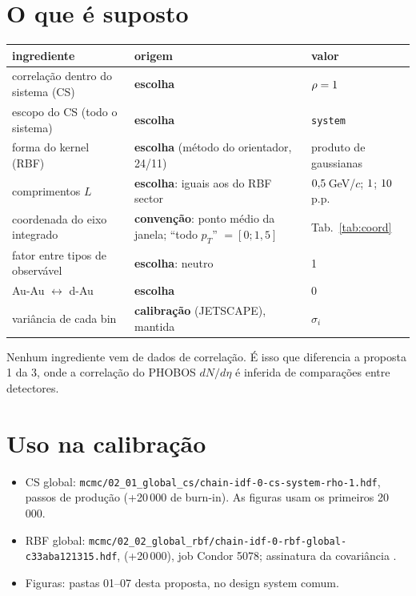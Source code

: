 \documentclass[11pt,a4paper]{article}
\newcommand{\arq}[1]{\texttt{\nolinkurl{#1}}}
\begin{document}
\section{O que é suposto}
\begin{center}\small
\begin{tabularx}{\linewidth}{@{}Y l l@{}}
\toprule
ingrediente & origem & valor \\
\midrule
correlação dentro do sistema (CS) & \textbf{escolha} & $\rho=1$ \\
escopo do CS (todo o sistema) & \textbf{escolha} & \texttt{system} \\
forma do kernel (RBF) & \textbf{escolha} (método do orientador, 24/11) & produto de gaussianas \\
comprimentos $L$ & \textbf{escolha}: iguais aos do RBF sector & $0{,}5$\,GeV/$c$; $1$; $10$ p.p. \\
coordenada do eixo integrado & \textbf{convenção}: ponto médio da janela; ``todo $p_T$'' $=[0;1{,}5]$ & Tab.~\ref{tab:coord} \\
fator entre tipos de observável & \textbf{escolha}: neutro & 1 \\
Au-Au $\leftrightarrow$ d-Au & \textbf{escolha} & 0 \\
variância de cada bin & \textbf{calibração} (JETSCAPE), mantida & $\sigma_i$ \\
\bottomrule
\end{tabularx}
\end{center}
Nenhum ingrediente vem de dados de correlação. É isso que diferencia a proposta 1 da 3, onde a correlação do PHOBOS
$dN/d\eta$ é inferida de comparações entre detectores.

\section{Uso na calibração}
\begin{itemize}[nosep]
\item CS global: \arq{mcmc/02_01_global_cs/chain-idf-0-cs-system-rho-1.hdf}, \valStepsCs{} passos de produção
(+20\,000 de burn-in). As figuras usam os primeiros 20\,000.
\item RBF global: \arq{mcmc/02_02_global_rbf/chain-idf-0-rbf-global-c33aba121315.hdf}, \valStepsRbf{}
(+20\,000), job Condor 5078; assinatura da covariância \texttt{\valSigRbf}.
\item Figuras: pastas 01--07 desta proposta, no design system comum.
\end{itemize}
\end{document}
